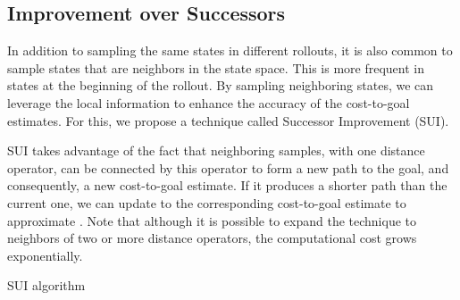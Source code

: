 \subsection{Improvement over Successors}
\label{sec:hvfc}

In addition to sampling the same states in different rollouts, it is also common to sample states that are neighbors in the state space. This is more frequent in states at the beginning of the rollout. By sampling neighboring states, we can leverage the local information to enhance the accuracy of the cost-to-goal estimates. For this, we propose a technique called Successor Improvement (SUI).

SUI takes advantage of the fact that neighboring samples, with one distance operator, can be connected by this operator to form a new path to the goal, and consequently, a new cost-to-goal estimate. If it produces a shorter path than the current one, we can update to the corresponding cost-to-goal estimate to approximate \hstar. Note that although it is possible to expand the technique to neighbors of two or more distance operators, the computational cost grows exponentially.

\begin{algorithm}[ht]
    \SetAlgoLined




    \caption{SUI algorithm}
    \label{alg:sui}
\end{algorithm}


